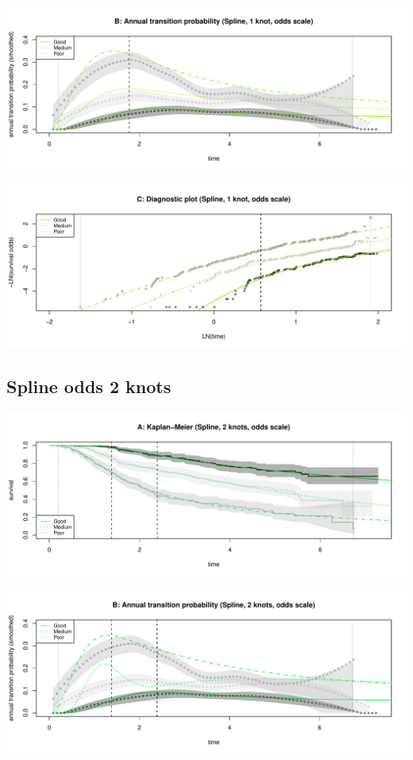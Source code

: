 \documentclass[]{article}
\begin{document}
\begin{flushleft}\includegraphics[height=0.3\textheight]{images/spline_odds1-2} \end{flushleft}

\begin{flushleft}\includegraphics[height=0.3\textheight]{images/spline_odds1-3} \end{flushleft}

\subsection{Spline odds 2 knots}\label{spline-odds-2-knots}

\begin{flushleft}\includegraphics[height=0.3\textheight]{images/spline_odds2-1} \end{flushleft}

\begin{flushleft}\includegraphics[height=0.3\textheight]{images/spline_odds2-2} \end{flushleft}
\end{document}
